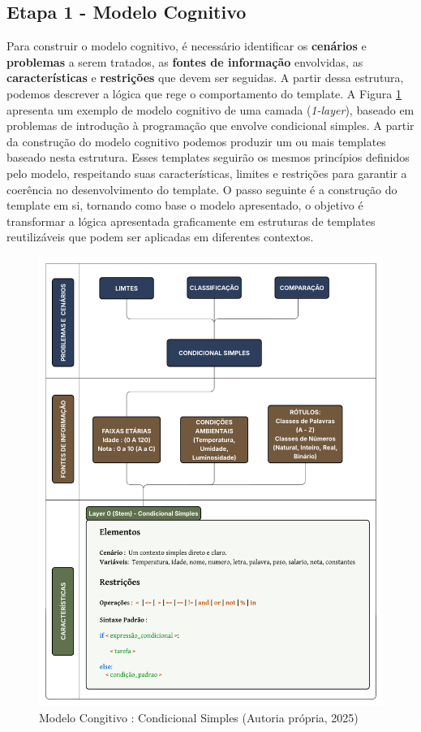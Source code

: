 \subsection{Etapa 1 - Modelo Cognitivo }

Para construir o modelo cognitivo, é necessário identificar os \textbf{cenários} e \textbf{problemas} a serem tratados, as \textbf{fontes de informação} envolvidas, as \textbf{características} e \textbf{restrições} que devem ser seguidas. A partir dessa estrutura, podemos descrever a lógica que rege o comportamento do template. A Figura \ref{fig:condicional-simples}  apresenta um exemplo de modelo cognitivo de uma camada (\textit{1-layer}), baseado em problemas de introdução à programação que envolve condicional simples.  A partir da construção do modelo cognitivo podemos produzir um ou mais templates baseado nesta estrutura. Esses templates seguirão os mesmos princípios definidos pelo modelo, respeitando suas características, limites e restrições para garantir a coerência no desenvolvimento do template.  O passo seguinte é a construção do template em si, tornando como base o modelo apresentado, o objetivo é transformar a lógica apresentada graficamente em estruturas de templates reutilizáveis que podem ser aplicadas em diferentes contextos. 
\begin{figure}[ht]
	\centering
	\includegraphics[width=16cm]{./imagens/capitulo4/modelo-cognitivo-1-layer}
	\caption{Modelo Congitivo : Condicional Simples  (Autoria própria, 2025)}
	\label{fig:condicional-simples}
\end{figure}
